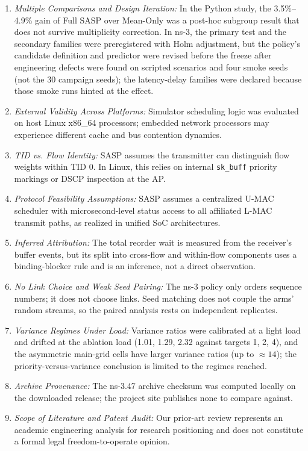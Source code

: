 \documentclass[10pt,journal,compsoc]{IEEEtran}
\begin{document}
\begin{enumerate}
    \item \emph{Multiple Comparisons and Design Iteration:} In the Python study, the 3.5\%--4.9\% gain of Full SASP over Mean-Only was a post-hoc subgroup result that does not survive multiplicity correction. In ns-3, the primary test and the secondary families were preregistered with Holm adjustment, but the policy's candidate definition and predictor were revised before the freeze after engineering defects were found on scripted scenarios and four smoke seeds (not the 30 campaign seeds); the latency-delay families were declared because those smoke runs hinted at the effect.
    \item \emph{External Validity Across Platforms:} Simulator scheduling logic was evaluated on host Linux x86\_64 processors; embedded network processors may experience different cache and bus contention dynamics.
    \item \emph{TID vs. Flow Identity:} SASP assumes the transmitter can distinguish flow weights within TID 0. In Linux, this relies on internal \texttt{sk\_buff} priority markings or DSCP inspection at the AP.
    \item \emph{Protocol Feasibility Assumptions:} SASP assumes a centralized U-MAC scheduler with microsecond-level status access to all affiliated L-MAC transmit paths, as realized in unified SoC architectures.

    \item \emph{Inferred Attribution:} The total reorder wait is measured from the receiver's buffer events, but its split into cross-flow and within-flow components uses a binding-blocker rule and is an inference, not a direct observation.
    \item \emph{No Link Choice and Weak Seed Pairing:} The ns-3 policy only orders sequence numbers; it does not choose links. Seed matching does not couple the arms' random streams, so the paired analysis rests on independent replicates.
    \item \emph{Variance Regimes Under Load:} Variance ratios were calibrated at a light load and drifted at the ablation load (1.01, 1.29, 2.32 against targets 1, 2, 4), and the asymmetric main-grid cells have larger variance ratios (up to $\approx 14$); the priority-versus-variance conclusion is limited to the regimes reached.
    \item \emph{Archive Provenance:} The ns-3.47 archive checksum was computed locally on the downloaded release; the project site publishes none to compare against.
    \item \emph{Scope of Literature and Patent Audit:} Our prior-art review represents an academic engineering analysis for research positioning and does not constitute a formal legal freedom-to-operate opinion.
\end{enumerate}
\end{document}
